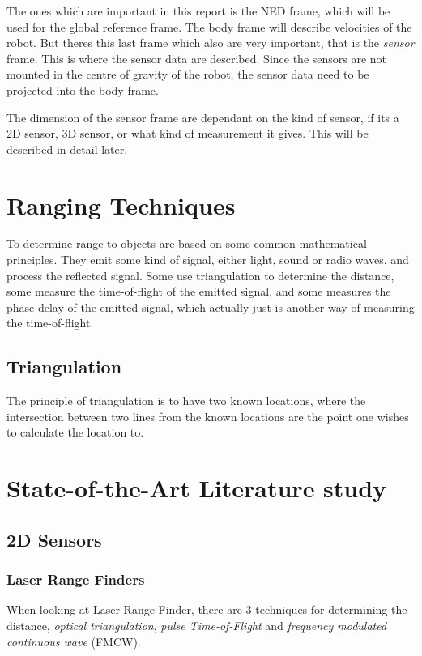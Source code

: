     The ones which are important in this report is the NED frame, which will be used for
    the global reference frame. The body frame will describe velocities of the robot. But
    theres this last frame which also are very important, that is the \emph{sensor} frame.
    This is where the sensor data are described. Since the sensors are not mounted in the
    centre of gravity of the robot, the sensor data need to be projected into the body
    frame. 

    The dimension of the sensor frame are dependant on the kind of sensor, if its a 2D
    sensor, 3D sensor, or what kind of measurement it gives. This will be described in
    detail later.
	

\section{Ranging Techniques}
To determine range to objects are based on some common mathematical principles. They emit
some kind of signal, either light, sound or radio waves, and process the reflected signal.
Some use triangulation to determine the distance, some measure the time-of-flight of the
emitted signal, and some measures the phase-delay of the emitted signal, which actually
just is another way of measuring the time-of-flight. 

\subsection{Triangulation}
The principle of triangulation is to have two known locations, where the intersection
between two lines from the known locations are the point one wishes to calculate the
location to. 


\section{State-of-the-Art Literature study}


\subsection{2D Sensors}

\subsubsection{Laser Range Finders}


When looking at Laser Range Finder, there are 3 techniques for determining the distance,
\emph{optical triangulation}, \emph{pulse Time-of-Flight} and \emph{frequency modulated
continuous wave} (FMCW). \cite{laser-ranging-critical-review}

